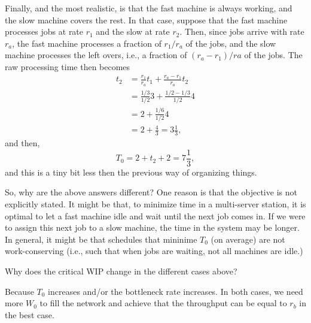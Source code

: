 \begin{question}
\begin{solution}
    Finally, and the most realistic, is that the fast machine is
    always working, and the slow machine covers the rest.  In that
    case, suppose that the fast machine processes jobs at rate $r_1$
    and the slow at rate $r_2$. Then, since jobs arrive with rate
    $r_a$, the fast machine processes a fraction of $r_1/r_a$ of the
    jobs, and the slow machine processes the left overs, i.e., a
    fraction of $(r_a-r_1)/ra$ of the jobs. The raw processing time then becomes
    \begin{equation*}
      \begin{split}
      t_2 
&= \frac{r_1}{r_a} t_1 + \frac{r_a-r_1}{r_a} t_2 \\
&= \frac{1/3}{1/2} 3 + \frac{1/2-1/3}{1/2} 4 \\
&= 2 + \frac{1/6}{1/2} 4 \\
&= 2 + \frac{4}{3} = 3\frac13,
      \end{split}
    \end{equation*}
and then,
\begin{equation*}
  T_0 = 2 + t_2 + 2 = 7\frac13,
\end{equation*}
and this is a tiny bit less then the previous way of organizing things. 

So, why are the above answers different? One reason is that the
objective is not explicitly stated. It might be that, to minimize time
in a multi-server station, it is optimal to let a fast machine idle
and wait until the next job comes in. If we were to assign this next
job to a slow machine, the time in the system may be longer.  In
general, it might be that schedules that mininime $T_0$ (on average)
are not work-conserving (i.e., such that when jobs are waiting, not
all machines are idle.)
\end{solution}
\end{question}


\begin{question}
Why does the critical WIP change in the different cases above? 
\end{question}
\begin{solution}
  Because $T_0$ increases and/or the bottleneck rate increases. In
  both cases, we need more $W_0$ to fill the network and achieve that
  the throughput can be equal to $r_b$ in the best case.

\end{solution}

